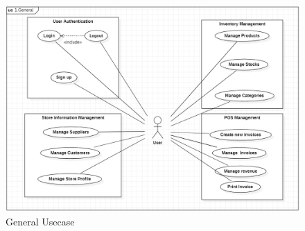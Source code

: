 \documentclass[../thesis.tex]{subfiles}
\begin{document}
\begin{figure}[H]
    \centering
    \includegraphics[width=1\textwidth]{images/UCD_General.png}
    \caption{General Usecase}
    \label{fig:UCD_General}
\end{figure}
\end{document}
